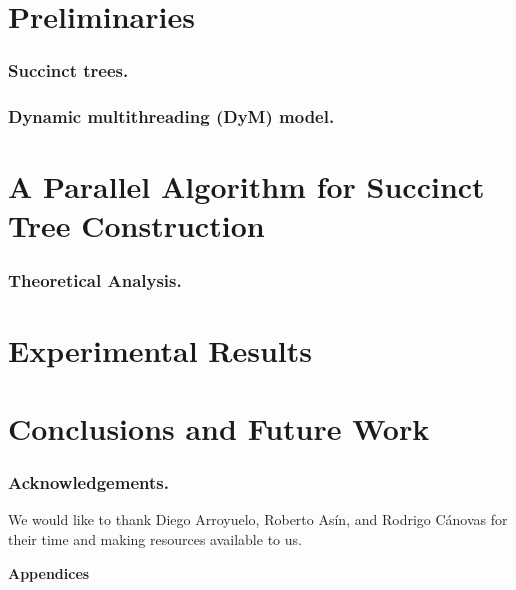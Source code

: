 \documentclass[runningheads]{llncs}
\begin{document}

\section{Preliminaries}
\label{sec:relwork}


\subsubsection{Succinct trees.}
\label{subsec:suctrees}


\subsubsection{Dynamic multithreading (DyM) model.}
\label{subsec:dym}


\section{A Parallel Algorithm for Succinct Tree Construction}
\label{sec:multicoreST}


\subsubsection{Theoretical Analysis.}
\label{subsec:theoreticalAnalysis}


\section{Experimental Results}
\label{sec:exps}





\section{Conclusions and Future Work}
\label{sec:conclusion}


\subsubsection*{Acknowledgements.}
We would like to thank Diego Arroyuelo, Roberto As\'{i}n, and Rodrigo
C\'{a}novas for their time and making resources available to us.




\newpage
\appendix
\begin{center}
  \bf \Large Appendices
\end{center}


\end{document}
